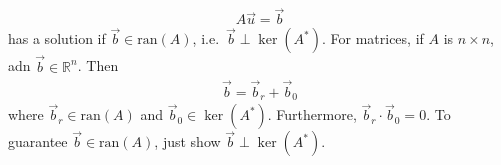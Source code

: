 \documentclass{article}
\newcommand{\Rl}{\mathbb{R}}
\newcommand{\ran}{\text{ran}}
\begin{document}
            \begin{align}
                A\vec{u} = \vec{b}
            \end{align}
            has a solution if $\vec{b} \in \ran(A)$, i.e.~$\vec{b}\perp \ker(A^*)$.  For matrices, if $A$ is $n\times n$, adn $\vec{b} \in \Rl^n$.  Then
            \begin{align}
                \vec{b} = \vec{b}_r + \vec{b}_0
            \end{align}
            where $\vec{b}_r \in \ran(A)$ and $\vec{b}_0 \in \ker(A^*)$.  Furthermore, $\vec{b}_r \cdot \vec{b}_0 = 0$.  To guarantee $\vec{b} \in \ran(A)$, just show $\vec{b} \perp \ker(A^*)$.
\end{document}
